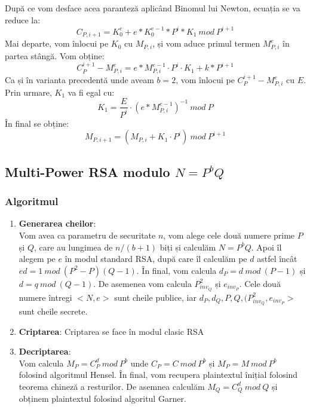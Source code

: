 \documentclass[12pt, oneside]{book}
\begin{document}
		  După ce vom desface acea paranteză aplicând Binomul lui Newton, ecuația se va reduce la:
		  $$ C_{P,i+1} = K_{0}^{e} + e*K_{0}^{e-1} *P^i*K_1 \ mod \ P^{i+1}$$
		  Mai departe, vom înlocui pe $K_0$ cu $M_{P,i}$, și vom aduce primul termen $M_{P,i}^{e}$ în partea stângă. Vom obține:
		  $$C_{P}^{i+1} - M_{P,i}^{e} = e*M_{P,i}^{e-1} \cdot   P^i \cdot   K_1 + k *P^{i+1}$$
		  Ca și în varianta precedentă unde aveam $b=2$, vom înlocui pe $C_{P}^{i+1} - M_{P,i}^{e}$ cu $E$. Prin urmare, $K_1$ va fi egal cu:
		  $$K_1 = \frac{E}{P^i} \cdot   (e*M_{P,i}^{e-1})^{-1} \ mod \ P$$
		  În final se obține:
		  $$M_{P,i+1}= (M_{P,i} + K_1 \cdot   P^i) \ mod \ P^{i+1}$$
		  \subsection{Multi-Power RSA modulo $N=P^bQ$}
		  \subsubsection{Algoritmul}
		  \begin{enumerate}
		  \item \textbf{Generarea cheilor}:\\
		  Vom avea ca parametru de securitate $n$, vom alege cele două numere prime $P$ și $Q$, care au lungimea de $n/(b+1)$ biți și calculăm $N=P^bQ$. Apoi îl alegem pe $e$ în modul standard RSA, după care îl calculăm pe $d$ astfel încât $ed=1 \ mod \ (P^2-P)(Q-1)$. În final, vom calcula $d_P= d \ mod \ (P-1)$ și $d=q \ mod \ (Q-1)$. De asemenea vom calcula $P_{inv_Q}^{2}$ și $e_{inv_P}$. Cele două numere întregi $<N,e>$ sunt cheile publice, iar $d_P,d_Q,P,Q,(P_{inv_Q}^{2},e_{inv_P}>$ sunt cheile secrete.
		  \item \textbf{Criptarea}:
		  Criptarea se face în modul clasic RSA
		  
		  \item \textbf{Decriptarea}: \\
		  Vom calcula $M_P = C_{P}^{d} \ mod \ P^b $ unde $C_P = C \ mod \ P^b$ și  $M_P = M \ mod \ P^b$ folosind algoritmul Hensel. În final, vom recupera plaintextul înițial folosind teorema chineză a resturilor. De asemnea calculăm $M_Q= C_{Q}^{d} \ mod \ Q$ și obținem plaintextul folosind algoritul Garner.
		  \end{enumerate}
		  
\end{document}
